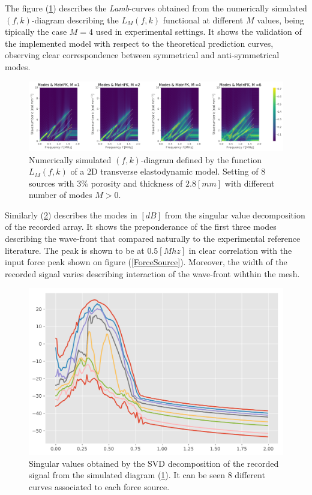 The figure (\ref{FK-DiagramS8P3M28}) describes the \textit{Lamb}-curves obtained from the numerically simulated $(f,k)$-diagram describing the $L_M(f,k)$ functional at different $M$ values, being tipically the case $M=4$ used in experimental settings. It shows the validation of the implemented model with respect to the theoretical prediction curves, observing clear correspondence between symmetrical and anti-symmetrical modes.


\begin{figure}[!h]
	\centering
	\includegraphics[width=\textwidth]{images/TimeMultSous/2DTimeS8P3ElasticFK28M780_y.pdf}
	\caption{Numerically simulated $(f,k)$-diagram defined by the function $L_M(f,k)$ of a 2D transverse elastodynamic model. Setting of 8 sources with $3\%$ porosity and thickness of $2.8 [mm]$ with different number of modes $M>0$.}
	\label{FK-DiagramS8P3M28}
\end{figure}


Similarly (\ref{SVD-S8P3M28}) describes the modes in $[dB]$ from the singular value decomposition of the recorded array. It shows the preponderance of the first three modes describing the wave-front that compared naturally to the experimental reference literature. The peak is shown to be at $0.5 [Mhz]$ in clear correlation with the input force peak shown on figure (\ref{ForceSource}). Moreover, the width of the recorded signal varies describing interaction of the wave-front wihthin the mesh.

\begin{figure}[!h]
	\centering
	\includegraphics[scale=.5]{images/TimeMultSous/2DTimeS8P3Elastic28_SV.pdf}
	\caption{Singular values obtained by the SVD decomposition of the recorded signal from the simulated diagram (\ref{FK-DiagramS8P3M28}). It can be seen 8 different curves associated to each force source.}
	\label{SVD-S8P3M28}
\end{figure}

